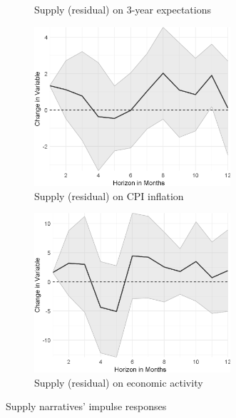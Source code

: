 \begin{figure}
\begin{subfigure}{00.24\textwidth}
		\caption{Supply (residual) on 3-year expectations}
	\end{subfigure}
	\begin{subfigure}{00.24\textwidth}
		\includegraphics[width=0.8\textwidth]{output/lp/baseline/bHP/supply/supplyoninflation_djn.eps}
		\caption{Supply (residual) on CPI inflation}
	\end{subfigure}
	\begin{subfigure}{00.24\textwidth}
		\includegraphics[width=0.8\textwidth]{output/lp/baseline/bHP/supply/supplyoneconac_djn.eps}
		\caption{Supply (residual) on economic activity}
	\end{subfigure}
	\caption{Supply narratives' impulse responses}
	\label{fig:irf_2}
\end{figure}
